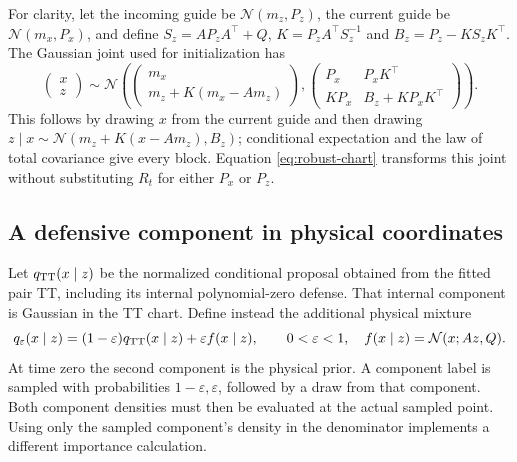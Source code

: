 \documentclass[11pt]{article}
\begin{document}
For clarity, let the incoming guide be $\mathcal N(m_z,P_z)$, the current
guide be $\mathcal N(m_x,P_x)$, and define
$S_z=A P_zA^\top+Q$, $K=P_zA^\top S_z^{-1}$ and
$B_z=P_z-KS_zK^\top$. The Gaussian joint used for initialization has
\begin{equation}
 \begin{pmatrix}x\\z\end{pmatrix}\sim\mathcal N\!\left(
 \begin{pmatrix}m_x\\m_z+K(m_x-Am_z)\end{pmatrix},
 \begin{pmatrix}P_x&P_xK^\top\\KP_x&B_z+KP_xK^\top\end{pmatrix}
 \right).
 \label{eq:robust-initializer-joint}
\end{equation}
This follows by drawing $x$ from the current guide and then drawing
$z\mid x\sim\mathcal N(m_z+K(x-Am_z),B_z)$; conditional expectation
and the law of total covariance give every block. Equation
\eqref{eq:robust-chart} transforms this joint without substituting $R_t$
for either $P_x$ or $P_z$.

\subsection{A defensive component in physical coordinates}

Let $q_{\rm TT}(x\mid z)$ be the normalized conditional proposal obtained
from the fitted pair TT, including its internal polynomial-zero defense.
That internal component is Gaussian in the TT chart. Define instead the
additional physical mixture
\begin{equation}
 q_\varepsilon(x\mid z)
 =(1-\varepsilon)q_{\rm TT}(x\mid z)
       +\varepsilon f(x\mid z),\qquad 0<\varepsilon<1,
 \quad f(x\mid z)=\mathcal N(x;Az,Q).
 \label{eq:robust-mixture}
\end{equation}
At time zero the second component is the physical prior. A component label
is sampled with probabilities $1-\varepsilon,\varepsilon$, followed by a
draw from that component. Both component densities must then be evaluated
at the actual sampled point. Using only the sampled component's density in
the denominator implements a different importance calculation.
\end{document}
